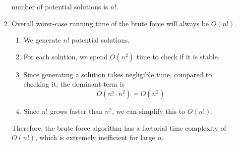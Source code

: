 \documentclass[12pt]{article}
\begin{document}
\begin{enumerate}
\begin{enumerate}
            number of potential solutions is $n$!.
            \item Overall worst-case running time of the brute force will always be $O(n!)$.
                \begin{enumerate}[-]
                    \item We generate $n$! potential solutions.
                    \item For each solution, we spend $O(n^2)$ time to check if it is stable.
                    \item Since generating a solution takes negligible time, compared to checking it, the dominant 
                    term is 
                    \[ O(n! \cdot n^2) = O(n^2) \]
                    \item Since $n$! grows faster than $n^2$, we can simplify this to $O(n!)$.
                \end{enumerate}
            Therefore, the brute force algorithm has a factorial time complexity of $O(n!)$, which is extremely inefficient for
            large $n$.
        \end{enumerate}
   \end{enumerate}
\end{document}
